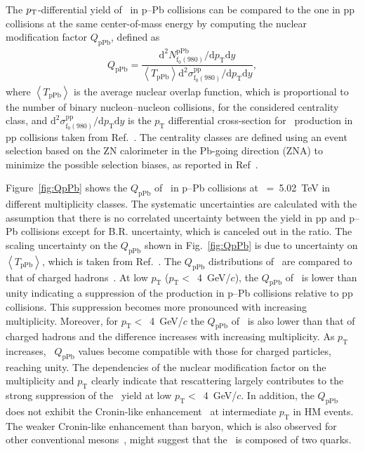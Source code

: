 The $p_{\rm{T}}$-differential yield of \fzero~in p--Pb collisions can be compared to the one in pp collisions at the same center-of-mass energy by computing the nuclear modification factor $Q_{\mbox{pPb}}$, defined as 
\begin{eqnarray}
Q_{\mbox{pPb}} = \dfrac{\mathrm{d}^{2} N_{\mathrm{f}_{0}(980)}^{\mathrm{pPb}} / \mathrm{d} p_{\mathrm{T}} \mathrm{d}y }{ \left\langle T_{\mathrm{pPb}} \right\rangle \mathrm{d}^{2} \sigma_{\mathrm{f}_{0}(980)}^{\mathrm{pp}}/ \mathrm{d} p_{\mathrm{T}} \mathrm{d}y },
\end{eqnarray}
where $\left\langle T_{\mathrm{pPb}} \right\rangle$ is the average nuclear overlap function, which is proportional to the number of binary nucleon--nucleon collisions, for the considered centrality class, and $\mathrm{d}^{2} \sigma_{\mathrm{f}_{0}(980)}^{\mathrm{pp}}/ \mathrm{d} p_{\mathrm{T}} \mathrm{d}y$ is the $p_{\mathrm{T}}$ differential cross-section for \fzero~production in pp collisions taken from Ref.~\cite{ALICE:2022qnb}. The centrality classes are defined using an event selection based on the ZN calorimeter in the Pb-going direction (ZNA) to minimize the possible selection biases, as reported in Ref~\cite{ALICE:2014xsp}.

Figure~\ref{fig:QpPb} shows the $Q_{\mbox{pPb}}$ of \fzero~in p--Pb collisions at \snn~=~5.02~TeV in different multiplicity classes. The systematic uncertainties are calculated with the assumption that there is no correlated uncertainty between the yield in pp and p--Pb collisions except for B.R. uncertainty, which is canceled out in the ratio. The scaling uncertainty on the $Q_{\mbox{pPb}}$ shown in Fig.~\ref{fig:QpPb} is due to uncertainty on $\left\langle T_{\mathrm{pPb}} \right\rangle$, which is taken from Ref.~\cite{ALICE:2014xsp}. The $Q_{\mbox{pPb}}$ distributions of \fzero~are compared to that of charged hadrons~\cite{ALICE:2014xsp}. At low $p_{\mathrm{T}}$ ($p_{\mathrm{T}}<$~4~GeV/$c$), the $Q_{\mbox{pPb}}$ of \fzero~is lower than unity indicating a suppression of the production in p--Pb collisions relative to pp collisions. This suppression becomes more pronounced with increasing multiplicity. Moreover, for $p_{\mathrm{T}}<$~4~GeV/$c$ the $Q_{\mbox{pPb}}$ of \fzero~is also lower than that of charged hadrons and the difference increases with increasing multiplicity. As $p_{\mathrm{T}}$ increases, \fzero~$Q_{\mbox{pPb}}$ values become compatible with those for charged particles, reaching unity. The dependencies of the nuclear modification factor on the multiplicity and $p_{\mathrm{T}}$ clearly indicate that rescattering largely contributes to the strong suppression of the \fzero~yield at low $p_{\mathrm{T}}<$~4~GeV/$c$. In addition, the $Q_{\mbox{pPb}}$ does not exhibit the Cronin-like enhancement~\cite{Cronin:1974zm} at intermediate $p_{\mathrm{T}}$ in HM events. The weaker Cronin-like enhancement than baryon, which is also observed for other conventional mesons~\cite{ALICE:2016dei, ALICE:2016sak}, might suggest that the \fzero~is composed of two quarks.